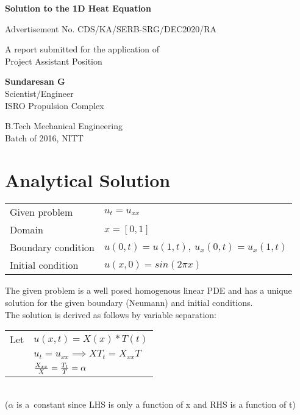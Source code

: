 \documentclass[12pt]{article}
\author{Sundaresan G}
\begin{document}
	
\begin{titlepage}
	\begin{center}
		\vspace*{1cm}
		
		\textbf{\Large{Solution to the 1D Heat Equation}}
		
		\vspace{0.5cm}
		Advertisement No. CDS/KA/SERB-SRG/DEC2020/RA
		
		\vspace{1.5cm}
		
		A report submitted for the application of\\
		Project Assistant Position
		
		
		\vfill
		
		\textbf{\large{Sundaresan G}}\\
		Scientist/Engineer\\
		ISRO Propulsion Complex
		
		\vspace{0.8cm}
		
		B.Tech Mechanical Engineering\\
		Batch of 2016, NITT\\
		
	\end{center}
\end{titlepage}
\tableofcontents

	\section{Analytical Solution}
	\begin{center}
		\begin{tabular}{l l}
			Given problem & $u_t=u_{xx}$\\		
			Domain & $x=[0,1]$\\
			Boundary condition & $u(0,t)=u(1,t),\
			u_x(0,t)=u_x(1,t)$\\
			Initial condition & $u(x,0)=sin(2\pi x)$
		\end{tabular}
	\end{center}
	The given problem is a well posed homogenous linear PDE and has a unique solution for the given boundary (Neumann) and initial conditions.\\
	The solution is derived as follows by variable separation:\\
	
	\begin{tabular}{r l}
		Let & $u(x,t)=X(x)*T(t)$ \\
		& $u_t=u_{xx} \implies XT_t=X_{xx}T$ \\
		& ${X_{xx}\over X} = {T_t \over T} = \alpha$
		
				
	\end{tabular} \\
	($\alpha$ is a\ constant since LHS is only a function of x and RHS is a function of t)\\
	
\end{document}

